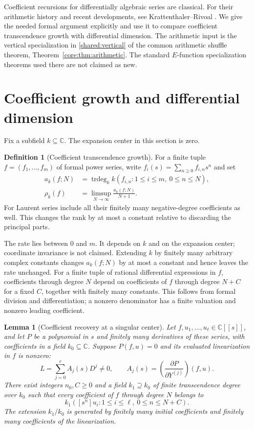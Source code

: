 \documentclass[11pt,a4paper]{article}
\newcommand{\C}{\mathbb C}
\DeclareMathOperator{\trdeg}{trdeg}
\newtheorem{lemma}[theorem]{Lemma}
\theoremstyle{definition}
\newtheorem{definition}[theorem]{Definition}
\theoremstyle{remark}
\numberwithin{equation}{section}
\begin{document}
Coefficient recursions for differentially algebraic series are
classical. For their arithmetic history and recent developments, see
Krattenthaler--Rivoal \cite{KR}. We give the needed formal argument
explicitly and use it to compare coefficient transcendence growth
with differential dimension. The arithmetic input is the vertical
specialization in \ref{shared:vertical} of the common arithmetic
shuffle theorem, Theorem~\ref{core:thm:arithmetic}. The standard
$E$-function specialization theorems used there are not claimed as new.

\section{Coefficient growth and differential dimension}
\label{diff:sec:growth}

Fix a subfield $k\subseteq\C$. The expansion center in this section
is zero.

\begin{definition}[Coefficient transcendence growth]
For a finite tuple $f=(f_1,\ldots,f_m)$ of formal power series, write
$f_i(s)=\sum_{n\ge0}f_{i,n}s^n$ and set
\begin{align}
 a_k(f;N)&=\trdeg_k k(f_{i,n}:1\le i\le m,\ 0\le n\le N),
       \label{diff:eq:rank}\\
 \rho_k(f)&=\limsup_{N\to\infty}\frac{a_k(f;N)}{N+1}.
       \label{diff:eq:rate}
\end{align}
For Laurent series include all their finitely many negative-degree
coefficients as well. This changes the rank by at most a constant
relative to discarding the principal parts.
\end{definition}

The rate lies between $0$ and $m$. It depends on $k$ and on the
expansion center; coordinate invariance is not claimed. Extending $k$
by finitely many arbitrary complex constants changes
$a_k(f;N)$ by at most a constant and hence leaves the rate unchanged.
For a finite tuple of rational differential expressions in $f$,
coefficients through degree $N$ depend on coefficients of $f$ through
degree $N+C$ for a fixed $C$, together with finitely many constants.
This follows from formal division and differentiation; a nonzero
denominator has a finite valuation and nonzero leading coefficient.

\begin{lemma}[Coefficient recovery at a singular center]\label{diff:lem:recovery}
Let $f,u_1,\ldots,u_\ell\in\C[[s]]$, and let $P$ be a polynomial
in $s$ and finitely many derivatives of these series, with coefficients
in a field $k_0\subseteq\C$. Suppose $P(f,u)=0$ and its evaluated
linearization in $f$ is nonzero:
\[
 L=\sum_{j=0}^r A_j(s)D^j\ne0,\qquad
 A_j(s)=\left(\frac{\partial P}{\partial Y^{(j)}}\right)(f,u).
\]
There exist integers $n_0,C\ge0$ and a field $k_1\supseteq k_0$
of finite transcendence degree over $k_0$ such that every coefficient
of $f$ through degree $N$ belongs to
\[
 k_1([s^n]u_i:1\le i\le\ell,\ 0\le n\le N+C).
\]
The extension $k_1/k_0$ is generated by finitely many initial
coefficients and finitely many coefficients of the linearization.
\end{lemma}
\end{document}
